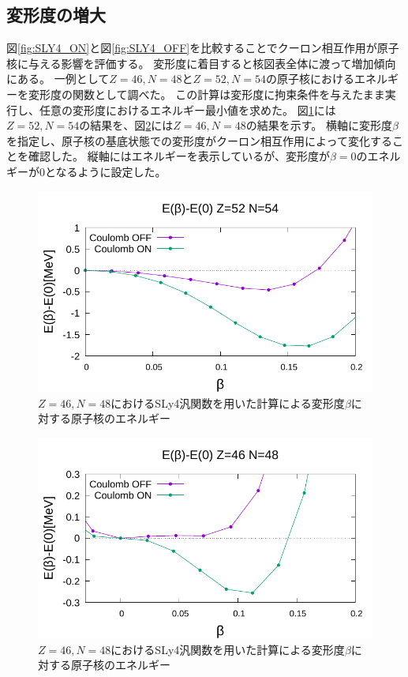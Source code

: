\documentclass[12pt]{jarticle}
\begin{document}
\subsection{変形度の増大}
図\ref{fig:SLY4_ON}と図\ref{fig:SLY4_OFF}を比較することでクーロン相互作用が原子核に与える影響を評価する。
変形度に着目すると核図表全体に渡って増加傾向にある。
一例として$Z=46,N=48$と$Z=52,N=54$の原子核におけるエネルギーを変形度の関数として調べた。
この計算は変形度に拘束条件を与えたまま実行し、任意の変形度におけるエネルギー最小値を求めた。
図\ref{fig:ene_beta_52-54}には$Z=52,N=54$の結果を、図\ref{fig:ene_beta_46-48}には$Z=46,N=48$の結果を示す。
横軸に変形度$\beta$を指定し、原子核の基底状態での変形度がクーロン相互作用によって変化することを確認した。
縦軸にはエネルギーを表示しているが、変形度が$\beta=0$のエネルギーが0となるように設定した。
\begin{figure}[ht]
    \centering
    \includegraphics{../Z=52_N=54_energy_beta.pdf}
    \caption{
        $Z=46,N=48$におけるSLy4汎関数を用いた計算による変形度$\beta$に対する原子核のエネルギー
        }\label{fig:ene_beta_52-54}
\end{figure}
\begin{figure}[ht]
    \centering
    \includegraphics{../Z=46_N=48_energy_beta.pdf}
    \caption{
        $Z=46,N=48$におけるSLy4汎関数を用いた計算による変形度$\beta$に対する原子核のエネルギー
        }\label{fig:ene_beta_46-48}
\end{figure}
\end{document}
